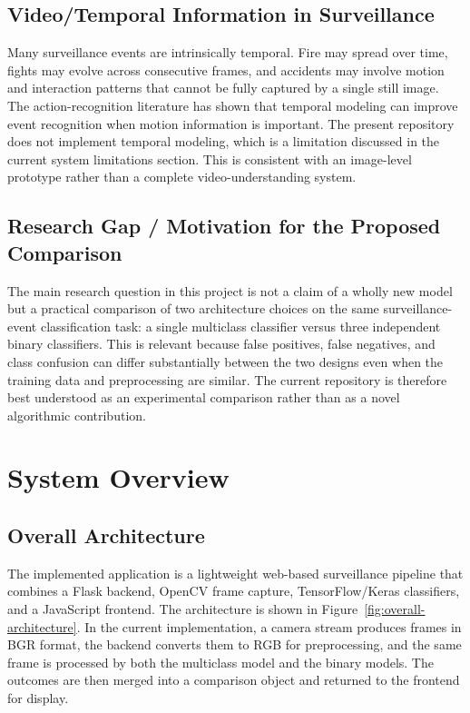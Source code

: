\documentclass[11pt,a4paper]{article}
\begin{document}
\subsection{Video/Temporal Information in Surveillance}
Many surveillance events are intrinsically temporal. Fire may spread over time, fights may evolve across consecutive frames, and accidents may involve motion and interaction patterns that cannot be fully captured by a single still image. The action-recognition literature has shown that temporal modeling can improve event recognition when motion information is important. The present repository does not implement temporal modeling, which is a limitation discussed in the current system limitations section. This is consistent with an image-level prototype rather than a complete video-understanding system.

\subsection{Research Gap / Motivation for the Proposed Comparison}
The main research question in this project is not a claim of a wholly new model but a practical comparison of two architecture choices on the same surveillance-event classification task: a single multiclass classifier versus three independent binary classifiers. This is relevant because false positives, false negatives, and class confusion can differ substantially between the two designs even when the training data and preprocessing are similar. The current repository is therefore best understood as an experimental comparison rather than as a novel algorithmic contribution.

\section{System Overview}
\subsection{Overall Architecture}
The implemented application is a lightweight web-based surveillance pipeline that combines a Flask backend, OpenCV frame capture, TensorFlow/Keras classifiers, and a JavaScript frontend. The architecture is shown in Figure~\ref{fig:overall-architecture}. In the current implementation, a camera stream produces frames in BGR format, the backend converts them to RGB for preprocessing, and the same frame is processed by both the multiclass model and the binary models. The outcomes are then merged into a comparison object and returned to the frontend for display.
\end{document}
